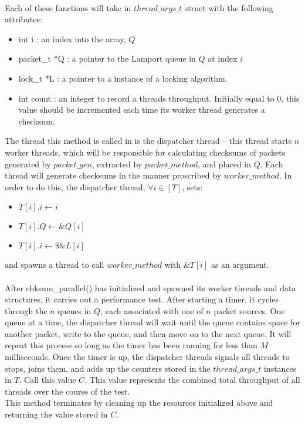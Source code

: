 \documentclass[]{article}
\begin{document}
\begin{itemize}
\begin{itemize}
		\\
		Each of these functions will take in $thread\_args\_t$ struct with the following attributes:
		\begin{itemize}
			\item int i : an index into the array, $Q$
			\item packet\_t *Q : a pointer to the Lamport queue in $Q$ at index $i$
			\item lock\_t *L : a pointer to a instance of a locking algorithm.
			\item int count : an integer to record a threads throughput. Initially equal to 0, this value should be incremented each time its worker thread generates a checksum.
		\end{itemize}

		The thread this method is called in is the dispatcher thread -- this thread starts $n$ worker threads, which will be responsible for calculating checksums of packets generated by  $packet\_gen$, extracted by $packet\_method$, and placed in $Q$. Each thread will generate checksums in the manner proscribed by $worker\_method$. In order to do this, the dispatcher thread, $\forall i \in [T]$, sets:
		\begin{itemize}
			\item $T[i].i \leftarrow i$
			\item $T[i].Q \leftarrow \&Q[i]$
			\item $T[i].i \leftarrow \$ \&L[i]$
		\end{itemize} 
		and spawns a thread to call $worker\_method$ with $\&T[i]$ as an argument.
		\\\\
		After chksum\_parallel() has initialized and spawned its worker threads and data structures, it carries out a performance test. After starting a timer, it cycles through the $n$ queues in $Q$, each associated with one of $n$ packet sources. One queue at a time, the dispatcher thread will wait until the queue contains space for another packet, write to the queue, and then move on to the next queue. It will repeat this process so long as the timer has been running for less than $M$ milliseconds. Once the timer is up, the dispatcher threads signals all threads to stops, joins them, and adds up the counters stored in the $thread\_args\_t$ instances in $T$. Call this value $C$. This value represents the combined total throughput of all threads over the course of the test.
		\\
		This method terminates by cleaning up the resources initialized above and returning the value stored in $C$.
		

\end{itemize}
\end{itemize}
\end{document}
